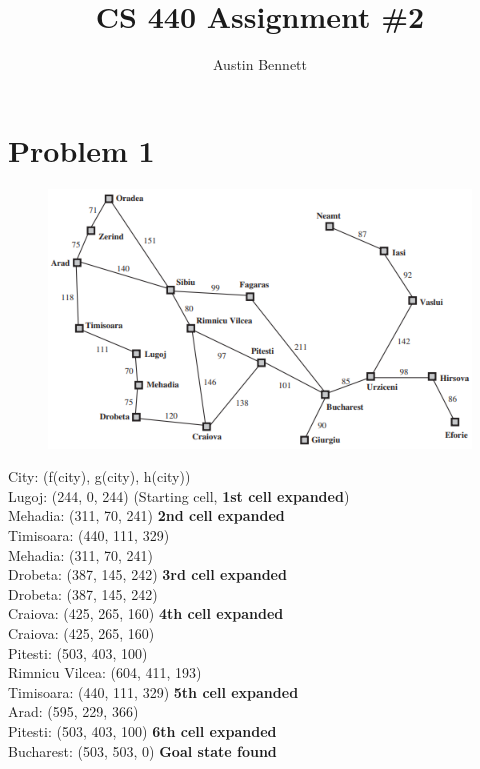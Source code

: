 \documentclass[12pt]{article}
\newcommand\tab[1][1cm]{\hspace*{#1}}
\begin{document}
\title{CS 440 Assignment \#2}
\author{Austin Bennett}
\maketitle

\section *{Problem 1}
\begin{figure}[!htb]
	\centering
	\includegraphics[width=.8\textwidth]{bulgaria2.png}
\end{figure}
City: (f(city), g(city), h(city)) \\
Lugoj: (244, 0, 244) (Starting cell, \textbf{1st cell expanded})\\
\tab Mehadia: (311, 70, 241) \textbf{2nd cell expanded} \\
\tab Timisoara: (440, 111, 329) \\
Mehadia: (311, 70, 241) \\
\tab Drobeta: (387, 145, 242) \textbf{3rd cell expanded} \\
Drobeta: (387, 145, 242) \\
\tab Craiova: (425, 265, 160) \textbf{4th cell expanded}\\
Craiova: (425, 265, 160) \\
\tab Pitesti: (503, 403, 100) \\
\tab Rimnicu Vilcea: (604, 411, 193) \\
Timisoara: (440, 111, 329) \textbf{5th cell expanded} \\
\tab Arad: (595, 229, 366) \\
Pitesti: (503, 403, 100) \textbf{6th cell expanded}\\
\tab Bucharest: (503, 503, 0) \textbf{Goal state found} \\
\newpage
\end{document}
